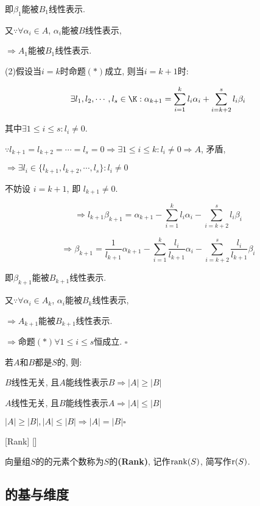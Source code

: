 \documentclass[UTF8]{ctexart}
\begin{document}
\begin{prf}
			即$\beta_{1}$能被$B_{1}$线性表示. 
			
			又$\because \forall \alpha_{i}\in A$, $\alpha_{i}$能被$B$线性表示, 
			
			$\Longrightarrow A_{1}$能被$B_{1}$线性表示. 
			
			(2)假设当$i=k$时命题$(*)$成立, 则当$i=k+1$时: 
			
			$$\exists l_{1},l_{2},\cdots, l_{s}\in \K: \alpha_{k+1}=\sum_{i=1}^{k}l_{i}\alpha_{i}+\sum_{i=k+2}^{s}l_{i}\beta_{i}$$
			
			其中$\exists1\leq i\leq s: l_{i}\neq 0$. 
			
			$\because l_{k+1}=l_{k+2}=\cdots=l_{s}=0\Longrightarrow \exists 1\leq i\leq k: l_{i}\neq 0 \Longrightarrow A$, 矛盾, 
			
			$\Longrightarrow\exists l_{i}\in \{l_{k+1},l_{k+2},\cdots, l_{s}\} :l_{i}\neq 0$
			
			不妨设 $i=k+1$, 即 $l_{k+1}\neq 0$. 
			
			$$\Longrightarrow l_{k+1}\beta_{k+1}=\alpha_{k+1}-\sum_{i=1}^{k}l_{i}\alpha_{i}-\sum_{i=k+2}^{s}l_{i}\beta_{i}$$
			
			$$\Longrightarrow \beta_{k+1}=\frac{1}{l_{k+1}}\alpha_{k+1}-\sum_{i=1}^{k}\frac{l_i}{l_{k+1}}\alpha_{i}-\sum_{i=k+2}^{s}\frac{l_i}{l_{k+1}}\beta_{i}$$
			
			即$\beta_{k+1}$能被$B_{k+1}$线性表示. 
			
			又$\because \forall \alpha_{i}\in A_{k}$, $\alpha_{i}$能被$B_{k}$线性表示, 
			
			$\Longrightarrow A_{k+1}$能被$B_{k+1}$线性表示. 
			
			$\Longrightarrow$命题$(*)\forall 1\leq i\leq s$恒成立. $\square$
			
			若$A$和$B$都是$S$的, 则: 
			
			$B$线性无关, 且$A$能线性表示$B \Longrightarrow |A|\geq |B|$
			
			$A$线性无关, 且$B$能线性表示$A \Longrightarrow |A|\leq |B|$
			
			$|A|\geq |B|,|A|\leq |B|\Longrightarrow |A|=|B|\square$
        \end{prf}
			
		\begin{dfn}
			[Rank]
			{\秩}
			[Rank]
			[]

			向量组$S$的 的元素个数称为$S$的\textbf{\秩(Rank)}, 记作${\rm rank}(S)$, 简写作${\rm r}(S)$. 
		\end{dfn}
	
	\subsection{ 的基与维度}
		
\end{document}
